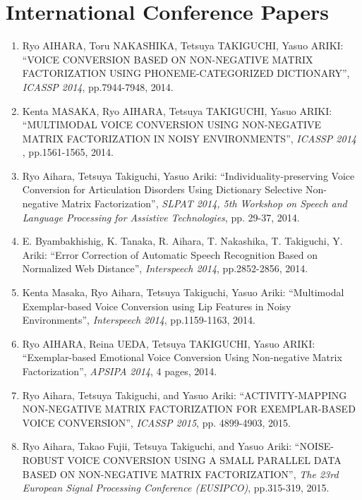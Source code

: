 \section*{International Conference Papers}
\begin{enumerate}

\item  Ryo AIHARA, Toru NAKASHIKA, Tetsuya TAKIGUCHI, Yasuo ARIKI:
``VOICE CONVERSION BASED ON NON-NEGATIVE MATRIX FACTORIZATION USING PHONEME-CATEGORIZED DICTIONARY'',
\textit{ICASSP 2014}, pp.7944-7948, 2014.

\item  Kenta MASAKA, Ryo AIHARA, Tetsuya TAKIGUCHI, Yasuo ARIKI:
``MULTIMODAL VOICE CONVERSION USING NON-NEGATIVE MATRIX FACTORIZATION IN NOISY ENVIRONMENTS'',
\textit{ICASSP 2014} , pp.1561-1565, 2014.

\item  Ryo Aihara, Tetsuya Takiguchi, Yasuo Ariki:
``Individuality-preserving Voice Conversion for Articulation Disorders Using Dictionary Selective Non-negative Matrix Factorization'',
\textit{SLPAT 2014, 5th Workshop on Speech and Language Processing for Assistive Technologies}, pp. 29-37, 2014.

\item  E. Byambakhishig, K. Tanaka, R. Aihara, T. Nakashika, T. Takiguchi, Y. Ariki:
``Error Correction of Automatic Speech Recognition Based on Normalized Web Distance'',
\textit{Interspeech 2014}, pp.2852-2856, 2014.

\item  Kenta Masaka, Ryo Aihara, Tetsuya Takiguchi, Yasuo Ariki:
``Multimodal Exemplar-based Voice Conversion using Lip Features in Noisy Environments'',
\textit{Interspeech 2014}, pp.1159-1163, 2014.

\item Ryo AIHARA, Reina UEDA, Tetsuya TAKIGUCHI, Yasuo ARIKI:
``Exemplar-based Emotional Voice Conversion Using Non-negative Matrix Factorization'',
\textit{APSIPA 2014}, 4 pages, 2014.

\item  Ryo Aihara, Tetsuya Takiguchi, and Yasuo Ariki:
``ACTIVITY-MAPPING NON-NEGATIVE MATRIX FACTORIZATION FOR EXEMPLAR-BASED VOICE CONVERSION'',
\textit{ICASSP 2015}, pp. 4899-4903, 2015.

\item  Ryo Aihara, Takao Fujii, Tetsuya Takiguchi, and Yasuo Ariki:
``NOISE-ROBUST VOICE CONVERSION USING A SMALL PARALLEL DATA BASED ON NON-NEGATIVE MATRIX FACTORIZATION'',
\textit{The 23rd European Signal Processing Conference (EUSIPCO)}, pp.315-319, 2015.


\end{enumerate}
